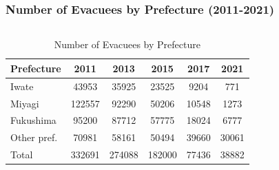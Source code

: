 \documentclass[serif, aspectratio=169]{beamer}
\begin{document}

\begin{frame}[label=evacuees_main]
\frametitle{Number of Evacuees by Prefecture (2011-2021)}
    \vspace{-0.7cm}
    \begin{columns}[T, onlytextwidth]
        \begin{column}{0.5\textwidth}
            \begin{table}[ht]
                \scriptsize
                \setlength{\tabcolsep}{4pt}
                \renewcommand{\arraystretch}{1.0}
                \begin{tabular}{@{}lS[table-format=6.0]S[table-format=6.0]S[table-format=6.0]S[table-format=6.0]S[table-format=6.0]@{}}
                \toprule
                Prefecture & {2011} & {2013} & {2015} & {2017} & {2021} \\
                \midrule
                Iwate & 43953 & 35925 & 23525 & 9204 & 771 \\
                Miyagi & 122557 & 92290 & 50206 & 10548 & 1273 \\
                Fukushima & 95200 & 87712 & 57775 & 18024 & 6777 \\
                Other pref. & 70981 & 58161 & 50494 & 39660 & 30061 \\
                \midrule
                Total & 332691 & 274088 & 182000 & 77436 & 38882 \\
                \bottomrule
                \end{tabular}
                \caption{Number of Evacuees by Prefecture}
                \label{tab:evacuees}
            \end{table}
        \end{column}
        

\end{columns}
\end{frame}
\end{document}
